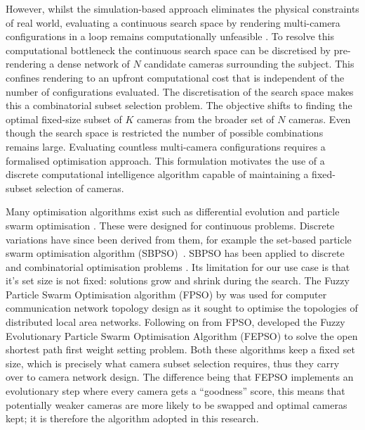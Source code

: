 However, whilst the simulation-based approach eliminates the physical constraints of real world, evaluating a continuous search space by rendering multi-camera configurations in a loop remains computationally unfeasible \cite{jorgensen2018simulation}. To resolve this computational bottleneck the continuous search space can be discretised by pre-rendering a dense network of $N$ candidate cameras surrounding the subject. This confines rendering to an upfront computational cost that is independent of the number of configurations evaluated. The discretisation of the search space makes this a combinatorial subset selection problem. The objective shifts to finding the optimal fixed-size subset of $K$ cameras from the broader set of $N$ cameras. 
Even though the search space is restricted the number of possible combinations remains large. Evaluating countless multi-camera configurations requires a formalised optimisation approach. This formulation motivates the use of a discrete computational intelligence algorithm capable of maintaining a fixed-subset selection of cameras. 

Many optimisation algorithms exist such as differential evolution \cite{storn1997differential} and particle swarm optimisation \cite{eberhart1995particle}. These were designed for continuous problems. Discrete variations have since been derived from them, for example the set-based particle swarm optimisation algorithm (SBPSO)~\cite{langeveld2015set}. SBPSO has been applied to discrete and combinatorial optimisation problems \cite{van2023set}. Its limitation for our use case is that it's set size is not fixed: solutions grow and shrink during the search. The Fuzzy Particle Swarm Optimisation algorithm (FPSO) by \citet{khan2012fuzzy} was used for computer communication network topology design as it sought to optimise the topologies of distributed local area networks. Following on from FPSO, \citet{mohiuddin2016fuzzy} developed the Fuzzy Evolutionary Particle Swarm Optimisation Algorithm (FEPSO) to solve the open shortest path first weight setting problem. 
Both these algorithms keep a fixed set size, which is precisely what camera subset selection requires, thus they carry over to camera network design. The difference being that FEPSO implements an evolutionary step where every camera gets a ``goodness'' score, this means that potentially weaker cameras are more likely to be swapped and optimal cameras kept; it is therefore the algorithm adopted in this research.



